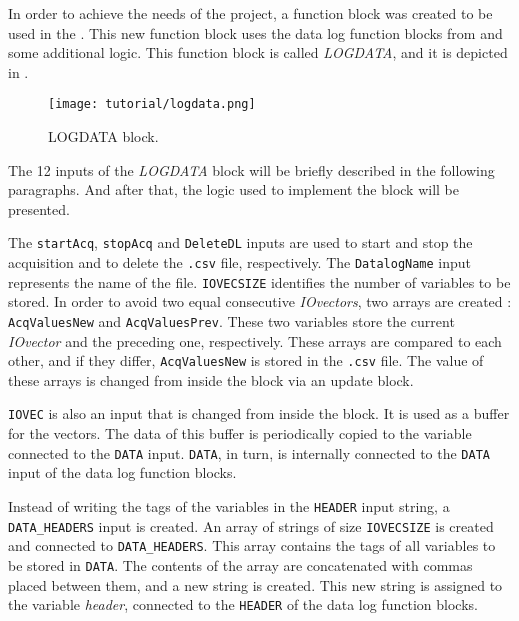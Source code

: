In order to achieve the needs of the project, a
function block was created to be used in the \LD. This new function block uses
the data log function blocks from  and some additional logic. This function block is called \emph{LOGDATA}, and it is
depicted in
.
\begin{figure}[H] \centering
 \texttt{[image: tutorial/logdata.png]}
  \caption{LOGDATA block.}
  \label{fig:logdataBlock}
\end{figure}
The 12 inputs of the \emph{LOGDATA} block will be briefly described in the following paragraphs. And after that, the logic used to implement the block will be presented.

The \verb|startAcq|,
\verb|stopAcq| and \verb|DeleteDL| inputs are used to start and stop the
acquisition and to
delete the \verb|.csv| file, respectively. The \verb|DatalogName| input represents the name of the file. \verb|IOVECSIZE| identifies the number of variables to
be stored.
In order to avoid two equal consecutive \emph{IOvectors}, two arrays are
created : \verb|AcqValuesNew| and
\verb|AcqValuesPrev|. These two variables store the current \emph{IOvector} and the preceding one, respectively. These arrays are compared to each other, and if
they differ, \verb|AcqValuesNew| is stored in the \verb|.csv| file. 
 The value of these arrays is
changed from inside the block via an update block.

\verb|IOVEC| is also an input that is changed from inside the block. It
is used as a buffer for the vectors. The data of this buffer is periodically copied to the variable connected to the
\verb|DATA| input. \verb|DATA|, in turn, is internally connected to the
\verb|DATA| input of the data log function blocks. 

Instead of writing the tags of the variables in the \verb|HEADER| input string, a \verb|DATA_HEADERS| input is created.
An array of strings of size \verb|IOVECSIZE| is created and connected to \verb|DATA_HEADERS|. This array contains the tags of all variables to be
stored in \verb|DATA|. The contents of the array are concatenated with
commas placed between them, and a new string is created. This new string is assigned to the variable
\emph{header}, connected to the \verb|HEADER| of the data log function blocks. 

